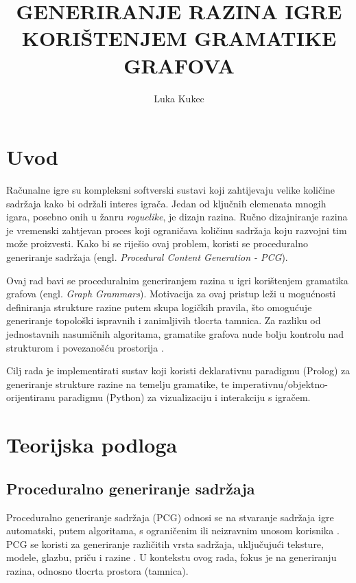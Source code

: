 \documentclass[]{foi}
\title{GENERIRANJE RAZINA IGRE KORI\v{S}TENJEM GRAMATIKE GRAFOVA}
\author{Luka Kukec}
\begin{document}
\maketitle

\tableofcontents

\makeatletter {} \makeatother
\pagestyle{plain}



\chapter{Uvod}
Računalne igre su kompleksni softverski sustavi koji zahtijevaju velike količine sadržaja kako bi održali interes igrača. Jedan od ključnih elemenata mnogih igara, posebno onih u žanru \textit{roguelike}, je dizajn razina. Ručno dizajniranje razina je vremenski zahtjevan proces koji ograničava količinu sadržaja koju razvojni tim može proizvesti. Kako bi se riješio ovaj problem, koristi se proceduralno generiranje sadržaja (engl. \textit{Procedural Content Generation - PCG}).

Ovaj rad bavi se proceduralnim generiranjem razina u igri korištenjem gramatika grafova (engl. \textit{Graph Grammars}). Motivacija za ovaj pristup leži u mogućnosti definiranja strukture razine putem skupa logičkih pravila, što omogućuje generiranje topološki ispravnih i zanimljivih tlocrta tamnica. Za razliku od jednostavnih nasumičnih algoritama, gramatike grafova nude bolju kontrolu nad strukturom i povezanošću prostorija \cite{dormans2010Adventures}.

Cilj rada je implementirati sustav koji koristi deklarativnu paradigmu (Prolog) za generiranje strukture razine na temelju gramatike, te imperativnu/objektno-orijentiranu paradigmu (Python) za vizualizaciju i interakciju s igračem.

\chapter{Teorijska podloga}

\section{Proceduralno generiranje sadržaja}
Proceduralno generiranje sadržaja (PCG) odnosi se na stvaranje sadržaja igre automatski, putem algoritama, s ograničenim ili neizravnim unosom korisnika \cite{togelius2011SearchBased}. PCG se koristi za generiranje različitih vrsta sadržaja, uključujući teksture, modele, glazbu, priču i razine \cite{adams2002AutomaticGeneration}. U kontekstu ovog rada, fokus je na generiranju razina, odnosno tlocrta prostora (tamnica).
\end{document}
